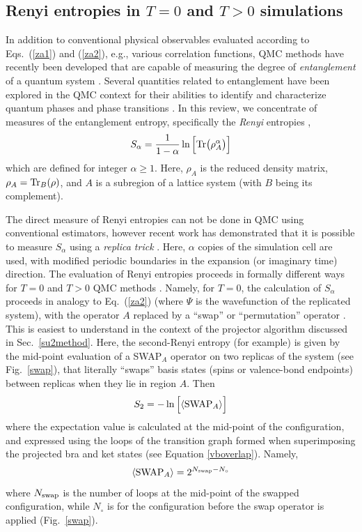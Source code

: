 \documentclass[range]{ar2e}
\begin{document}
\subsection{Renyi entropies in $T=0$ and $T>0$ simulations} 
\label{ss:renyi}

In addition to conventional physical observables evaluated according to Eqs.~(\ref{za1}) and (\ref{za2}), e.g., various correlation functions, 
QMC methods have recently been developed that are capable of measuring the degree of {\it entanglement} of a quantum system \cite{EntangleMeasure}. Several 
quantities related to entanglement have been explored in the QMC context for their abilities to identify and characterize quantum phases and phase 
transitions \cite{Tommaso1,Tommaso2,fluc1,fluc2,fid1,fid2}.  In this review, we concentrate of measures of the entanglement entropy, specifically 
the {\it Renyi} entropies \cite{renyi},
\begin{equation}
S_{\alpha} = \frac{1}{1-\alpha} \ln \Big[ {\rm Tr}\big( \rho_A^{\alpha} \big) \Big]
\end{equation}
which are defined for integer $\alpha \ge 1$.  Here, $\rho_A$ is the reduced density matrix, $\rho_A = {\rm Tr}_B (\rho)$, and $A$ is a subregion of 
a lattice system (with $B$ being its complement).  
 
The direct measure of Renyi entropies can not be done in QMC using conventional estimators, however recent work has demonstrated that it is possible to 
measure $S_{\alpha}$ using a {\it replica trick} \cite{Holz,Cardy, Fradkin, BP, Naka}.  Here, $\alpha$ copies of the simulation cell are used, with modified 
periodic boundaries in the expansion (or imaginary time) direction.  The evaluation of Renyi entropies proceeds in formally different ways for $T=0$ and $T>0$ 
QMC methods \cite{Hastings10,Melko10}.  Namely, for $T=0$, the calculation of $S_{\alpha}$ proceeds in analogy to Eq.~(\ref{za2}) (where $\Psi$ is the wavefunction 
of the replicated system), with the operator $A$ replaced by a ``swap'' \cite{Hastings10} or ``permutation'' operator \cite{Kallin11}. This is easiest to 
understand in the context of the projector algorithm discussed in Sec.~\ref{su2method}.  Here, the second-Renyi entropy (for example) is given by the
 mid-point evaluation of a SWAP$_A$ operator
on two replicas of the system (see Fig.~\ref{swap}), that literally ``swaps'' basis states 
(spins or valence-bond endpoints) between replicas when they lie in region $A$.  Then
\begin{equation}
 S_2 = -\ln \Big[ \langle {\rm SWAP}_A \rangle \Big]
\end{equation}
 where the expectation value is calculated at the mid-point of the configuration, and expressed using the loops of the transition graph formed when 
superimposing the projected bra and ket states (see Equation \ref{vboverlap}).  Namely,
\begin{equation}
\langle {\rm SWAP}_A \rangle = 2^{N_{\rm swap} - N_\circ } 
\end{equation} 
where $N_{\rm swap}$ is the number of loops at the mid-point of the swapped configuration, while $N_\circ$ is for the configuration before the swap operator 
is applied (Fig.~\ref{swap}).  
\end{document}
